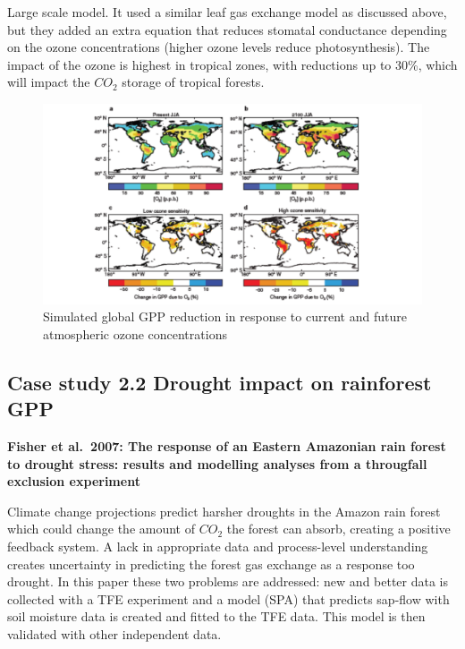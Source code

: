 \documentclass[
  12pt,
  oneside]{book}
\begin{document}
Large scale model. It used a similar leaf gas exchange model as discussed above, but they added an extra equation that reduces stomatal conductance depending on the ozone concentrations (higher ozone levels reduce photosynthesis). The impact of the ozone is highest in tropical zones, with reductions up to 30\%, which will impact the \(CO_2\) storage of tropical forests.

\begin{figure}

{\centering \includegraphics[width=0.8\linewidth]{figures/chap2/ozone} 

}

\caption{Simulated global GPP reduction in response to current and future atmospheric ozone concentrations}\label{fig:f223}
\end{figure}

\hypertarget{case-study-2.2-drought-impact-on-rainforest-gpp}{%
\subsection{Case study 2.2 Drought impact on rainforest GPP}\label{case-study-2.2-drought-impact-on-rainforest-gpp}}

\textbf{Fisher et al.~2007: The response of an Eastern Amazonian rain forest to drought stress: results and modelling analyses from a througfall exclusion experiment }

Climate change projections predict harsher droughts in the Amazon rain forest which could change the amount of \(CO_2\) the forest can absorb, creating a positive feedback system. A lack in appropriate data and process-level understanding creates uncertainty in predicting the forest gas exchange as a response too drought. In this paper these two problems are addressed: new and better data is collected with a TFE experiment and a model (SPA) that predicts sap-flow with soil moisture data is created and fitted to the TFE data. This model is then validated with other independent data.
\end{document}
